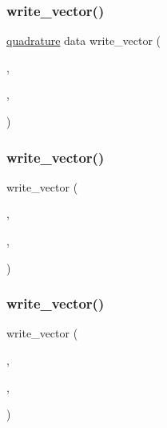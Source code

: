 \subsubsection{\texorpdfstring{write\+\_\+vector()}{write\_vector()}\hspace{0.1cm}{\footnotesize\ttfamily [3/8]}}
{\footnotesize\ttfamily \hyperlink{a00473_ac3595844f3ad3881eaa91da23069d5eb}{quadrature} data write\+\_\+vector (\begin{DoxyParamCaption}\item[{\hyperlink{a00473_ae0527cbfd56392d5095a691bbf10ba5b}{f\+ID}}]{,  }\item[{rq}]{,  }\item[{\textquotesingle{}rq\textquotesingle{}}]{ }\end{DoxyParamCaption})}

\mbox{\label{a01014_a97b63d67ee37fc31143a4908c76526d2}} 
\subsubsection{\texorpdfstring{write\+\_\+vector()}{write\_vector()}\hspace{0.1cm}{\footnotesize\ttfamily [4/8]}}
{\footnotesize\ttfamily write\+\_\+vector (\begin{DoxyParamCaption}\item[{\hyperlink{a00473_ae0527cbfd56392d5095a691bbf10ba5b}{f\+ID}}]{,  }\item[{sq}]{,  }\item[{\textquotesingle{}sq\textquotesingle{}}]{ }\end{DoxyParamCaption})}

\mbox{\label{a01014_ad305cfa7c575f18621c9cebf4215805d}} 
\subsubsection{\texorpdfstring{write\+\_\+vector()}{write\_vector()}\hspace{0.1cm}{\footnotesize\ttfamily [5/8]}}
{\footnotesize\ttfamily write\+\_\+vector (\begin{DoxyParamCaption}\item[{\hyperlink{a00473_ae0527cbfd56392d5095a691bbf10ba5b}{f\+ID}}]{,  }\item[{\hyperlink{a00605_aad57484016654da87125db86f4227ea3}{w}}]{,  }\item[{\textquotesingle{}\hyperlink{a00605_aad57484016654da87125db86f4227ea3}{w}\textquotesingle{}}]{ }\end{DoxyParamCaption})}

